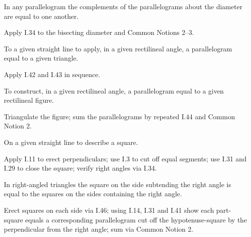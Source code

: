 \begin{claim}
\label{prop:I.43}
In any parallelogram the complements of the parallelograms about the
diameter are equal to one another.
\end{claim}
\begin{evidence}[Proof of I.43]
\label{ev:I.43}
Apply I.34 to the bisecting diameter and Common Notions 2--3.
\end{evidence}

\begin{claim}
\label{prop:I.44}
To a given straight line to apply, in a given rectilineal angle, a
parallelogram equal to a given triangle.
\end{claim}
\begin{evidence}[Proof of I.44]
\label{ev:I.44}
Apply I.42 and I.43 in sequence.
\end{evidence}

\begin{claim}
\label{prop:I.45}
To construct, in a given rectilineal angle, a parallelogram equal to
a given rectilineal figure.
\end{claim}
\begin{evidence}[Proof of I.45]
\label{ev:I.45}
Triangulate the figure; sum the parallelograms by repeated I.44 and
Common Notion 2.
\end{evidence}

\begin{claim}
\label{prop:I.46}
On a given straight line to describe a square.
\end{claim}
\begin{evidence}[Proof of I.46]
\label{ev:I.46}
Apply I.11 to erect perpendiculars; use I.3 to cut off equal segments;
use I.31 and I.29 to close the square; verify right angles via I.34.
\end{evidence}

\begin{claim}
\label{prop:I.47}
In right-angled triangles the square on the side subtending the right
angle is equal to the squares on the sides containing the right angle.
\end{claim}
\begin{evidence}[Proof of I.47]

\label{ev:I.47}
Erect squares on each side via I.46; using I.14, I.31 and I.41 show
each part-square equals a corresponding parallelogram cut off the
hypotenuse-square by the perpendicular from the right angle; sum via
Common Notion 2.
\end{evidence}

